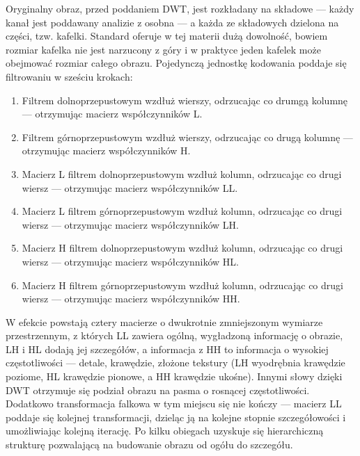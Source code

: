 Oryginalny obraz, przed poddaniem DWT, jest rozkładany na składowe --- każdy kanał jest poddawany analizie z osobna --- a każda ze składowych dzielona na części, tzw. kafelki. Standard oferuje w tej materii dużą dowolność, bowiem rozmiar kafelka nie jest narzucony z góry i w praktyce jeden kafelek może obejmować rozmiar całego obrazu. Pojedynczą jednostkę kodowania poddaje się filtrowaniu w sześciu krokach:
\begin{enumerate}
	\item Filtrem dolnoprzepustowym wzdłuż wierszy, odrzucając co drumgą kolumnę --- otrzymując macierz współczynników L.
	\item Filtrem górnoprzepustowym wzdłuż wierszy, odrzucając co drugą kolumnę --- otrzymując macierz współczynników H.
	\item Macierz L filtrem dolnoprzepustowym wzdłuż kolumn, odrzucając co drugi wiersz --- otrzymując macierz współczynników LL.
	\item Macierz L filtrem górnoprzepustowym wzdłuż kolumn, odrzucając co drugi wiersz --- otrzymując macierz współczynników LH.
	\item Macierz H filtrem dolnoprzepustowym wzdłuż kolumn, odrzucając co drugi wiersz --- otrzymując macierz współczynników HL.
	\item Macierz H filtrem górnoprzepustowym wzdłuż kolumn, odrzucając co drugi wiersz --- otrzymując macierz współczynników HH.
\end{enumerate}
W efekcie powstają cztery macierze o dwukrotnie zmniejszonym wymiarze przestrzennym, z których LL zawiera ogólną, wygładzoną informację o obrazie, LH i HL dodają jej szczegółów, a informacja z HH to informacja o wysokiej częstotliwości --- detale, krawędzie, złożone tekstury (LH wyodrębnia krawędzie poziome, HL krawędzie pionowe, a HH krawędzie ukośne). Innymi słowy dzięki DWT otrzymuje się podział obrazu na pasma o rosnącej częstotliwości. Dodatkowo transformacja falkowa w tym miejscu się nie kończy --- macierz LL poddaje się kolejnej transformacji, dzieląc ją na kolejne stopnie szczegółowości i umożliwiając kolejną iterację. Po kilku obiegach uzyskuje się hierarchiczną strukturę pozwalającą na budowanie obrazu od ogółu do szczegółu.

